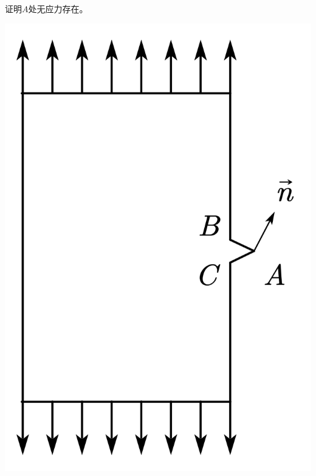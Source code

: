 \begin{example}
	证明$A$处无应力存在。
\end{example}
\centerline{\includegraphics[scale=0.5]{figure/2-7.png}}

